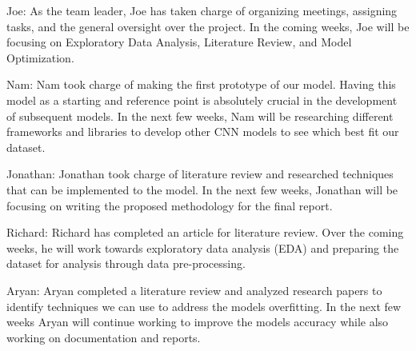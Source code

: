 \documentclass[conference]{IEEEtran}
\begin{document}
Joe: As the team leader, Joe has taken charge of organizing meetings, assigning tasks, and the general oversight over the project. In the coming weeks, Joe will be focusing on Exploratory Data Analysis, Literature Review, and Model Optimization. 

Nam: Nam took charge of making the first prototype of our model. Having this model as a starting and reference point is absolutely crucial in the development of subsequent models. In the next few weeks, Nam will be researching different frameworks and libraries to develop other CNN models to see which best fit our dataset.

Jonathan: Jonathan took charge of literature review and researched techniques that can be implemented to the model. In the next few weeks, Jonathan will be focusing on writing the proposed methodology for the final report.

Richard: Richard has completed an article for literature review. Over the coming weeks, he will work towards exploratory data analysis (EDA) and preparing the dataset for analysis through data pre-processing.

Aryan: Aryan completed a literature review and analyzed research papers to identify techniques we can use to address the models overfitting. In the next few weeks Aryan will continue working to improve the models accuracy while also working on documentation and reports. 
\end{document}
